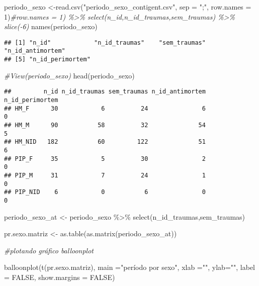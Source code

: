 \documentclass[
]{article}
\newenvironment{Shaded}{\begin{snugshade}}{\end{snugshade}}
\newcommand{\AttributeTok}[1]{\textcolor[rgb]{0.77,0.63,0.00}{#1}}
\newcommand{\CommentTok}[1]{\textcolor[rgb]{0.56,0.35,0.01}{\textit{#1}}}
\newcommand{\ConstantTok}[1]{\textcolor[rgb]{0.00,0.00,0.00}{#1}}
\newcommand{\DecValTok}[1]{\textcolor[rgb]{0.00,0.00,0.81}{#1}}
\newcommand{\FunctionTok}[1]{\textcolor[rgb]{0.00,0.00,0.00}{#1}}
\newcommand{\NormalTok}[1]{#1}
\newcommand{\OtherTok}[1]{\textcolor[rgb]{0.56,0.35,0.01}{#1}}
\newcommand{\SpecialCharTok}[1]{\textcolor[rgb]{0.00,0.00,0.00}{#1}}
\newcommand{\StringTok}[1]{\textcolor[rgb]{0.31,0.60,0.02}{#1}}
\begin{document}
\begin{Shaded}
\begin{Highlighting}[]
\NormalTok{periodo\_sexo }\OtherTok{\textless{}{-}}\FunctionTok{read.csv}\NormalTok{(}\StringTok{"periodo\_sexo\_contigent.csv"}\NormalTok{, }\AttributeTok{sep =} \StringTok{";"}\NormalTok{, }\AttributeTok{row.names =} \DecValTok{1}\NormalTok{)}\CommentTok{\#row.names = 1) \%\textgreater{}\% select(n\_id,n\_id\_traumas,sem\_traumas) \%\textgreater{}\% slice({-}6)}
\FunctionTok{names}\NormalTok{(periodo\_sexo)}
\end{Highlighting}
\end{Shaded}

\begin{verbatim}
## [1] "n_id"            "n_id_traumas"    "sem_traumas"     "n_id_antimortem"
## [5] "n_id_perimortem"
\end{verbatim}

\begin{Shaded}
\begin{Highlighting}[]
\CommentTok{\#View(periodo\_sexo)}
\FunctionTok{head}\NormalTok{(periodo\_sexo)}
\end{Highlighting}
\end{Shaded}

\begin{verbatim}
##         n_id n_id_traumas sem_traumas n_id_antimortem n_id_perimortem
## HM_F      30            6          24               6               0
## HM_M      90           58          32              54               5
## HM_NID   182           60         122              51               6
## PIP_F     35            5          30               2               0
## PIP_M     31            7          24               1               0
## PIP_NID    6            0           6               0               0
\end{verbatim}

\begin{Shaded}
\begin{Highlighting}[]
\NormalTok{periodo\_sexo\_at }\OtherTok{\textless{}{-}}\NormalTok{ periodo\_sexo }\SpecialCharTok{\%\textgreater{}\%} \FunctionTok{select}\NormalTok{(n\_id\_traumas,sem\_traumas)}

\NormalTok{pr.sexo.matriz }\OtherTok{\textless{}{-}} \FunctionTok{as.table}\NormalTok{(}\FunctionTok{as.matrix}\NormalTok{(periodo\_sexo\_at))}

\CommentTok{\#plotando gráfico balloonplot }

\FunctionTok{balloonplot}\NormalTok{(}\FunctionTok{t}\NormalTok{(pr.sexo.matriz), }\AttributeTok{main =}\StringTok{"período por sexo"}\NormalTok{, }\AttributeTok{xlab =}\StringTok{""}\NormalTok{, }\AttributeTok{ylab=}\StringTok{""}\NormalTok{,}
            \AttributeTok{label =} \ConstantTok{FALSE}\NormalTok{, }\AttributeTok{show.margins =} \ConstantTok{FALSE}\NormalTok{)}
\end{Highlighting}
\end{Shaded}
\end{document}
